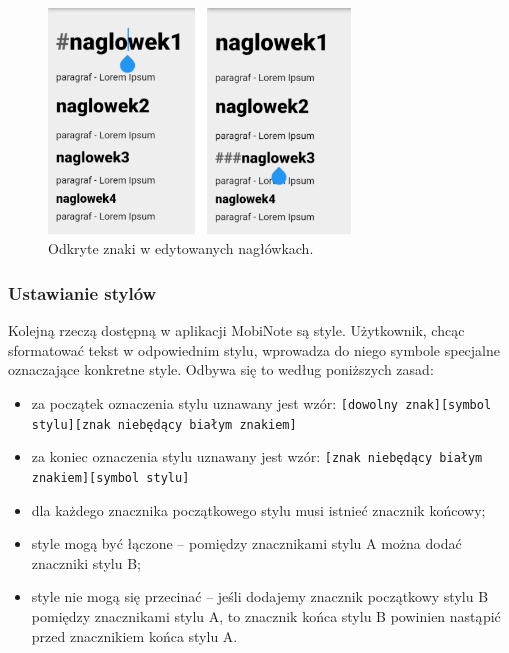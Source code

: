 \begin{figure}[ht]
    \centering
    \includegraphics[height=6cm]{images/pokazywanie_naglowkow.png}
    \caption{Odkryte znaki w edytowanych nagłówkach.}
\end{figure}

\subsubsection{Ustawianie stylów}
\label{subsec:ustawianieStyli}

Kolejną rzeczą dostępną w aplikacji MobiNote są style. Użytkownik, chcąc sformatować tekst w odpowiednim stylu, wprowadza do niego symbole specjalne oznaczające konkretne style.
Odbywa się to według poniższych zasad:

\begin{itemize}
    \setlength\itemsep{2mm}

    \item za początek oznaczenia stylu uznawany jest wzór: \newline
    \verb|[dowolny znak][symbol stylu][znak niebędący białym znakiem]|
    
    \item za koniec oznaczenia stylu uznawany jest wzór: \newline
    \verb|[znak niebędący białym znakiem][symbol stylu]|

    \item dla każdego znacznika początkowego stylu musi istnieć znacznik końcowy;
    
    \item style mogą być łączone -- pomiędzy znacznikami stylu A można dodać znaczniki stylu B;

    \item style nie mogą się przecinać -- jeśli dodajemy znacznik początkowy stylu B pomiędzy znacznikami stylu A, to znacznik końca stylu B powinien nastąpić przed znacznikiem końca stylu A. 
\end{itemize}

